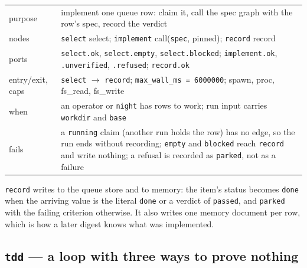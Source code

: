 \begin{center}\footnotesize
\begin{tabular}{@{}>{\raggedright\arraybackslash}p{}>{\raggedright\arraybackslash}p{}@{}}
  purpose & implement one queue row: claim it, call the spec graph with the row's spec, record
    the verdict \\
  nodes & \texttt{select} select; \texttt{implement} call(\texttt{spec}, pinned); \texttt{record} record \\
  ports & \texttt{select.ok}, \texttt{select.empty}, \texttt{select.blocked};
    \texttt{implement.ok}, \texttt{.unverified}, \texttt{.refused}; \texttt{record.ok} \\
  entry/exit, caps & \texttt{select} $\to$ \texttt{record}; \texttt{max\_wall\_ms = 6000000}; spawn, proc, fs\_read, fs\_write \\
  when & an operator or \texttt{night} has rows to work; run input carries \texttt{workdir}
    and \texttt{base} \\
  fails & a \texttt{running} claim (another run holds the row) has no edge, so the run ends
    without recording; \texttt{empty} and \texttt{blocked} reach \texttt{record} and write
    nothing; a refusal is recorded as \texttt{parked}, not as a failure \\
\end{tabular}
\end{center}

\texttt{record} writes to the queue store and to memory: the item's status becomes
\texttt{done} when the arriving value is the literal \texttt{done} or a verdict of
\texttt{passed}, and \texttt{parked} with the failing criterion otherwise. It also writes one
memory document per row, which is how a later digest knows what was implemented.

\subsection*{\texttt{tdd} --- a loop with three ways to prove nothing}

